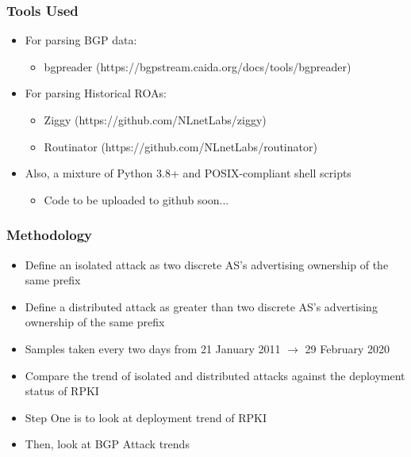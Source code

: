 \documentclass{beamer}
\begin{document}
\begin{frame}
    \frametitle{Tools Used}
    \pause
    \begin{itemize}
        \item For parsing BGP data:
        \begin{itemize}
            \item bgpreader (https://bgpstream.caida.org/docs/tools/bgpreader) \pause
        \end{itemize}
        \item For parsing Historical ROAs:
        \begin{itemize}
            \item Ziggy (https://github.com/NLnetLabs/ziggy)
            \item Routinator (https://github.com/NLnetLabs/routinator) \pause
        \end{itemize}
        \item Also, a mixture of Python 3.8+ and POSIX-compliant shell scripts
        \begin{itemize}
            \item Code to be uploaded to github soon...
        \end{itemize}
    \end{itemize}

\end{frame}

\begin{frame}
    \frametitle{Methodology}

    \begin{itemize}
        \item Define an isolated attack as two discrete AS's advertising ownership of the same prefix \pause
        \item Define a distributed attack as greater than two discrete AS's advertising ownership of the same prefix \pause
        \item Samples taken every two days from 21 January 2011 $\rightarrow$ 29 February 2020 \pause
        \item Compare the trend of isolated and distributed attacks against the deployment status of RPKI \pause
        \item Step One is to look at deployment trend of RPKI \pause
        \item Then, look at BGP Attack trends
    \end{itemize}

\end{frame}
\end{document}
